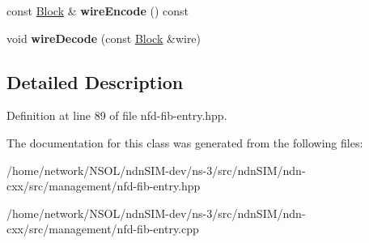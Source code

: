 \begin{DoxyCompactItemize}
\item 
const \hyperlink{classndn_1_1Block}{Block} \& {\bfseries wire\+Encode} () const\hypertarget{classndn_1_1nfd_1_1FibEntry_a20d92353d12415133d9530349890eee0}{}\label{classndn_1_1nfd_1_1FibEntry_a20d92353d12415133d9530349890eee0}

\item 
void {\bfseries wire\+Decode} (const \hyperlink{classndn_1_1Block}{Block} \&wire)\hypertarget{classndn_1_1nfd_1_1FibEntry_a4aab353a9bb82a1f7338d78870075869}{}\label{classndn_1_1nfd_1_1FibEntry_a4aab353a9bb82a1f7338d78870075869}

\end{DoxyCompactItemize}


\subsection{Detailed Description}


Definition at line 89 of file nfd-\/fib-\/entry.\+hpp.



The documentation for this class was generated from the following files\+:\begin{DoxyCompactItemize}
\item 
/home/network/\+N\+S\+O\+L/ndn\+S\+I\+M-\/dev/ns-\/3/src/ndn\+S\+I\+M/ndn-\/cxx/src/management/nfd-\/fib-\/entry.\+hpp\item 
/home/network/\+N\+S\+O\+L/ndn\+S\+I\+M-\/dev/ns-\/3/src/ndn\+S\+I\+M/ndn-\/cxx/src/management/nfd-\/fib-\/entry.\+cpp\end{DoxyCompactItemize}

